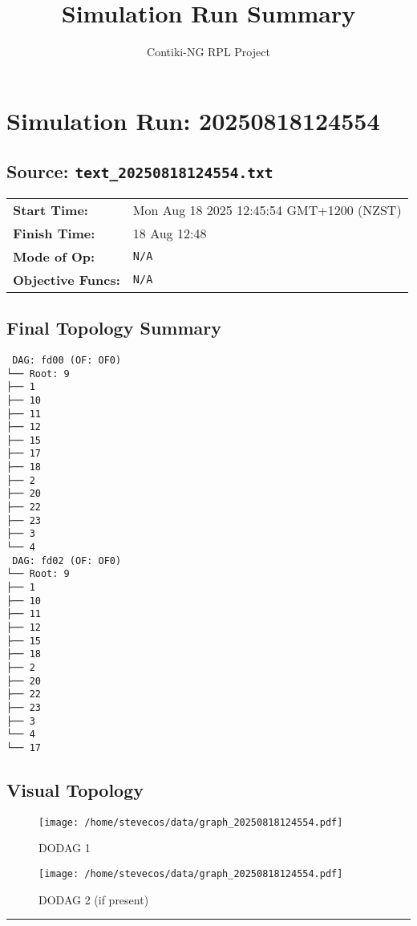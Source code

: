 \documentclass[a4paper]{article}
\begin{document}
\title{Simulation Run Summary}
\author{Contiki-NG RPL Project}
\maketitle


\section*{Simulation Run: 20250818124554}
\subsection*{Source: \texttt{text\_20250818124554.txt}}

\begin{tabular}{@{}ll}
\textbf{Start Time:} & Mon Aug 18 2025 12:45:54 GMT+1200 (NZST) \\
\textbf{Finish Time:} & 18 Aug 12:48 \\
\textbf{Mode of Op:} & \texttt{N/A} \\
\textbf{Objective Funcs:} & \texttt{N/A} \\
\end{tabular}

\subsection*{Final Topology Summary}
\begin{lstlisting}
 DAG: fd00 (OF: OF0)
└── Root: 9
├── 1
├── 10
├── 11
├── 12
├── 15
├── 17
├── 18
├── 2
├── 20
├── 22
├── 23
├── 3
└── 4
 DAG: fd02 (OF: OF0)
└── Root: 9
├── 1
├── 10
├── 11
├── 12
├── 15
├── 18
├── 2
├── 20
├── 22
├── 23
├── 3
└── 4
└── 17
\end{lstlisting}

\subsection*{Visual Topology}
\begin{figure}
    \centering
    \begin{minipage}{0.48\textwidth}
        \centering
        \texttt{[image: /home/stevecos/data/graph\_20250818124554.pdf]}
        \caption*{DODAG 1}
    \end{minipage}
    \hfill
    \begin{minipage}{0.48\textwidth}
        \centering
        \texttt{[image: /home/stevecos/data/graph\_20250818124554.pdf]}
        \caption*{DODAG 2 (if present)}
    \end{minipage}
\end{figure}

\hrule
\clearpage
\end{document}
